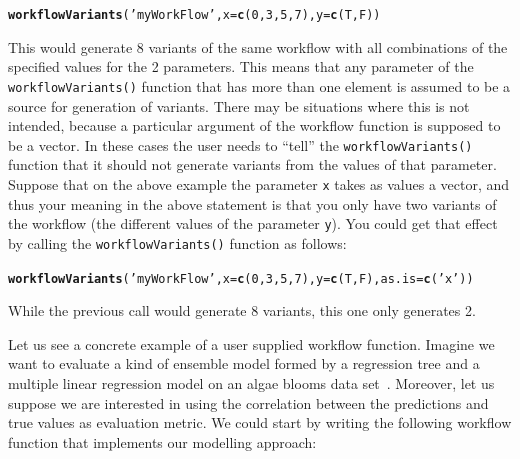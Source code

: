 \documentclass[10pt,a4paper]{article}\usepackage[]{graphicx}\usepackage[]{color}
\makeatletter
\newcommand{\hlnum}[1]{\textcolor[rgb]{0.686,0.059,0.569}{#1}}%
\newcommand{\hlstr}[1]{\textcolor[rgb]{0.192,0.494,0.8}{#1}}%
\newcommand{\hlstd}[1]{\textcolor[rgb]{0.345,0.345,0.345}{#1}}%
\newcommand{\hlkwc}[1]{\textcolor[rgb]{0.333,0.667,0.333}{#1}}%
\newcommand{\hlkwd}[1]{\textcolor[rgb]{0.737,0.353,0.396}{\textbf{#1}}}%
\newenvironment{kframe}{%
 \def\at@end@of@kframe{}%
 \ifinner\ifhmode%
  \def\at@end@of@kframe{\end{minipage}}%
  \begin{minipage}{\columnwidth}%
 \fi\fi%
 \def\FrameCommand##1{\hskip\@totalleftmargin \hskip-\fboxsep
 \colorbox{shadecolor}{##1}\hskip-\fboxsep
     \hskip-\linewidth \hskip-\@totalleftmargin \hskip\columnwidth}%
 \MakeFramed {\advance\hsize-\width
   \@totalleftmargin\z@ \linewidth\hsize
   \@setminipage}}%
 {\par\unskip\endMakeFramed%
 \at@end@of@kframe}
\newenvironment{knitrout}{}{} %
\makeatother
\begin{document}
\begin{knitrout}
\color{fgcolor}\begin{kframe}
\begin{alltt}
\hlkwd{workflowVariants}\hlstd{(}\hlstr{'myWorkFlow'}\hlstd{,}\hlkwc{x}\hlstd{=}\hlkwd{c}\hlstd{(}\hlnum{0}\hlstd{,}\hlnum{3}\hlstd{,}\hlnum{5}\hlstd{,}\hlnum{7}\hlstd{),}\hlkwc{y}\hlstd{=}\hlkwd{c}\hlstd{(T,F))}
\end{alltt}
\end{kframe}
\end{knitrout}


This would generate 8 variants of the same workflow with all
combinations of the specified values for the 2 parameters.  This means
that any parameter of the \texttt{workflowVariants()} function that has more
than one element is assumed to be a source for generation of
variants. There may be situations where this is not intended, because
a particular argument of the workflow function is supposed to be a
vector. In these cases the user needs to ``tell'' the
\texttt{workflowVariants()} function that it should not generate variants from
the values of that parameter. Suppose that on the above example the
parameter \texttt{x} takes as values a vector, and thus your meaning
in the above statement is that you only have two variants of the
workflow (the different values of the parameter \texttt{y}). You could get
that effect by calling the \texttt{workflowVariants()} function as follows:

\begin{knitrout}
\color{fgcolor}\begin{kframe}
\begin{alltt}
\hlkwd{workflowVariants}\hlstd{(}\hlstr{'myWorkFlow'}\hlstd{,}\hlkwc{x}\hlstd{=}\hlkwd{c}\hlstd{(}\hlnum{0}\hlstd{,}\hlnum{3}\hlstd{,}\hlnum{5}\hlstd{,}\hlnum{7}\hlstd{),}\hlkwc{y}\hlstd{=}\hlkwd{c}\hlstd{(T,F),}\hlkwc{as.is}\hlstd{=}\hlkwd{c}\hlstd{(}\hlstr{'x'}\hlstd{))}
\end{alltt}
\end{kframe}
\end{knitrout}


While the previous call would generate 8 variants, this one only generates 2.

Let us see a concrete example of a user supplied workflow
function. Imagine we want to evaluate a kind of ensemble model formed
by a regression tree and a multiple linear regression model on an
algae blooms data set~\cite{Tor10}. Moreover, let us suppose we are
interested in using the correlation between the predictions and true
values as evaluation metric. We could start by writing the following
workflow function that implements our modelling approach:
\end{document}
